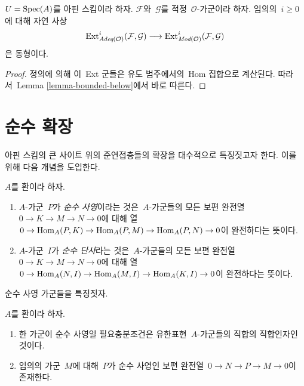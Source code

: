 \begin{lemma}
\label{lemma-ext-adequate}
$U = \mathop{\mathrm{Spec}}(A)$를 아핀 스킴이라 하자. $\mathcal{F}$와\ 
$\mathcal{G}$를 적정\  $\mathcal{O}$-가군이라 하자. 임의의\ 
$i \geq 0$에 대해 자연 사상
$$
\mathop{\mathrm{Ext}}\nolimits^i_{\textit{Adeq}(\mathcal{O})}(\mathcal{F}, \mathcal{G})
\longrightarrow
\mathop{\mathrm{Ext}}\nolimits^i_{\textit{Mod}(\mathcal{O})}(\mathcal{F}, \mathcal{G})
$$
은 동형이다.
\end{lemma}

\begin{proof}
정의에 의해 이\  Ext 군들은 유도 범주에서의\  Hom 집합으로 계산된다.
따라서\  Lemma \ref{lemma-bounded-below}에서 바로 따른다.
\end{proof}








\section{순수 확장}
\label{section-pure}

\noindent
아핀 스킴의 큰 사이트 위의 준연접층들의 확장을 대수적으로
특징짓고자 한다. 이를 위해 다음 개념을 도입한다.

\begin{definition}
\label{definition-pure}
$A$를 환이라 하자.
\begin{enumerate}
\item $A$-가군\  $P$가 {\it 순수 사영}이라는 것은\  $A$-가군들의
모든 보편 완전열\  $0 \to K \to M \to N \to 0$에 대해 열\ 
$0 \to \mathop{\mathrm{Hom}}\nolimits_A(P, K) \to \mathop{\mathrm{Hom}}\nolimits_A(P, M) \to \mathop{\mathrm{Hom}}\nolimits_A(P, N) \to 0$이
완전하다는 뜻이다.
\item $A$-가군\  $I$가 {\it 순수 단사}라는 것은\  $A$-가군들의
모든 보편 완전열\  $0 \to K \to M \to N \to 0$에 대해 열\ 
$0 \to \mathop{\mathrm{Hom}}\nolimits_A(N, I) \to \mathop{\mathrm{Hom}}\nolimits_A(M, I) \to \mathop{\mathrm{Hom}}\nolimits_A(K, I) \to 0$이
완전하다는 뜻이다.
\end{enumerate}
\end{definition}

\noindent
순수 사영 가군들을 특징짓자.

\begin{lemma}
\label{lemma-pure-projective}
$A$를 환이라 하자.
\begin{enumerate}
\item 한 가군이 순수 사영일 필요충분조건은 유한표현\ 
$A$-가군들의 직합의 직합인자인 것이다.
\item 임의의 가군\  $M$에 대해\  $P$가 순수 사영인 보편 완전열\ 
$0 \to N \to P \to M \to 0$이 존재한다.
\end{enumerate}
\end{lemma}

